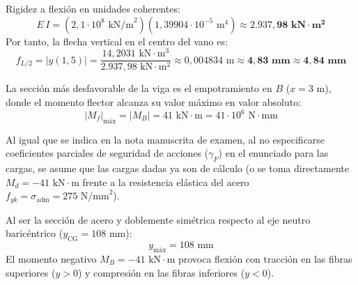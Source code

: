 Rigidez a flexión en unidades coherentes:
\begin{equation}
    E\,I = (2{,}1 \cdot 10^8\text{ kN/m}^2)(1{,}39904 \cdot 10^{-5}\text{ m}^4) \approx \mathbf{2.937{,}98\text{ kN}\cdot\text{m}^2}
\end{equation}
Por tanto, la flecha vertical en el centro del vano es:
\begin{equation}
    \boxed{f_{L/2} = |y(1{,}5)| = \frac{14{,}2031\text{ kN}\cdot\text{m}^3}{2.937{,}98\text{ kN}\cdot\text{m}^2} \approx 0{,}004834\text{ m} \approx \mathbf{4{,}83\text{ mm} \approx 4{,}84\text{ mm}}}
\end{equation}


La sección más desfavorable de la viga es el empotramiento en $B$ ($x = 3\text{ m}$), donde el momento flector alcanza su valor máximo en valor absoluto:
\begin{equation}
    |M_f|_{\text{máx}} = |M_B| = 41\text{ kN}\cdot\text{m} = 41 \cdot 10^6\text{ N}\cdot\text{mm}
\end{equation}

\begin{tcolorbox}[colback=yellow!10!white,colframe=orange!80!black,title=\textbf{Aclaración de Criterio de Mayoración ($M_d$ vs $M_k$)}]
    Al igual que se indica en la nota manuscrita de examen, al no especificarse coeficientes parciales de seguridad de acciones ($\gamma_F$) en el enunciado para las cargas, se asume que las cargas dadas ya son de cálculo (o se toma directamente $M_d = -41\text{ kN}\cdot\text{m}$ frente a la resistencia elástica del acero $f_{yk} = \sigma_{\text{adm}} = 275\text{ N/mm}^2$).
\end{tcolorbox}

Al ser la sección de acero y doblemente simétrica respecto al eje neutro baricéntrico ($y_{\text{CG}} = 108\text{ mm}$):
\begin{equation}
    y_{\text{máx}} = 108\text{ mm}
\end{equation}
El momento negativo $M_B = -41\text{ kN}\cdot\text{m}$ provoca flexión con tracción en las fibras superiores ($y > 0$) y compresión en las fibras inferiores ($y < 0$).

